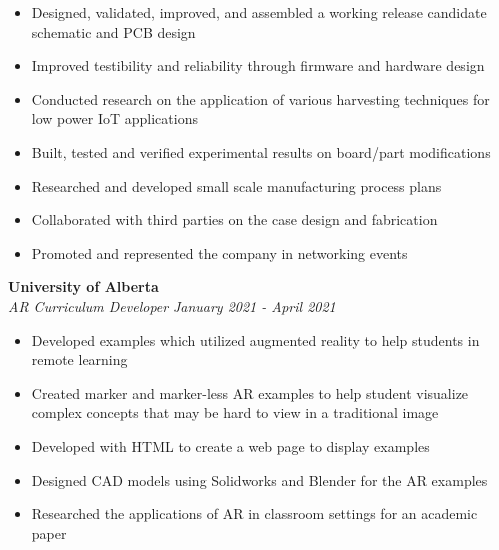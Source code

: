 \documentclass[a4paper,20pt]{article}
\begin{document}
    \begin{itemize}
        \item Designed, validated, improved, and assembled a working release candidate schematic and PCB design \vspace{-5pt}
        \item  Improved testibility and reliability through firmware and hardware design \vspace{-5pt}
        \item Conducted research on the application of various harvesting techniques for low power IoT applications \vspace{-5pt}
        \item Built, tested and verified experimental results on board/part modifications  \vspace{-5pt}
        \item Researched and developed small scale manufacturing process plans \vspace{-5pt}
        \item Collaborated with third parties on the case design and fabrication \vspace{-5pt}
        \item Promoted and represented the company in networking events 
    \end{itemize}
    \vspace{-1pt}
        \textbf{University of Alberta}\hspace{3cm}
        \textit{}\\
        \textit{AR Curriculum Developer}\hspace{10.05 cm}
        \textit{January 2021 - April 2021} \\
        \vspace{-18pt} 
        \hspace{-3pt}
        \begin{itemize}
            \item Developed examples which utilized augmented reality to help students in remote learning \vspace{-5pt}
            \item Created marker and marker-less AR examples to help student visualize complex concepts that may be hard to view in a traditional image \vspace{-5pt}
            \item Developed with HTML to create a web page to display examples \vspace{-5pt}
            \item Designed CAD models using Solidworks and Blender for the AR examples  \vspace{-5pt}
            \item Researched the applications of AR in classroom settings for an academic paper
        \end{itemize}        
\end{document}

